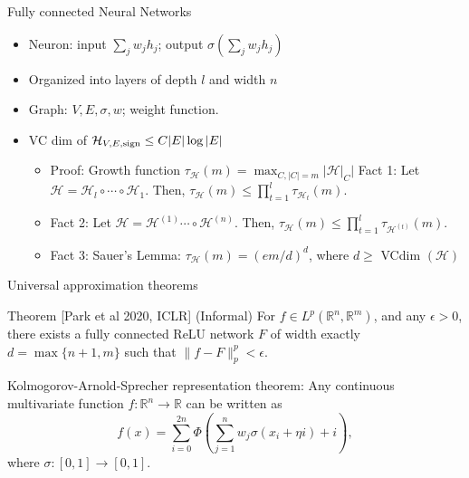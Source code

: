 \documentclass[final]{beamer}
\begin{document}
\begin{frame}{Fully connected Neural Networks}
	\begin{itemize}
		\item Neuron: input $\sum_j w_j h_j$; output $\sigma(\sum_j w_j h_j)$
		\item Organized into layers of depth $l$ and width $n$
		
		\item Graph: $V, E, \sigma, w$; weight function.
		\pause
	\item VC dim of $\mathcal{H}_{V, E, {\rm sign}} \leq C |E|\log |E|$
		\pause
		\begin{itemize}
		\item Proof: Growth function $\tau_{\mathcal{H}}(m) = \max_{C, |C|=m} |\mathcal{H}|_C| $
			\pause Fact 1: Let $\mathcal{H} =\mathcal{H}_l \circ \cdots \circ \mathcal{H}_1.$ Then,  $\tau_{\mathcal{H}}(m) \leq \prod_{t=1}^l \tau_{\mathcal{H}_t}(m)$.
			\pause 
			\item
			Fact 2: Let $\mathcal{H} =\mathcal{H}^{(1)}  \cdots \circ \mathcal{H}^{(n)}.$ Then,  $\tau_{\mathcal{H}}(m) \leq \prod_{t=1}^l \tau_{\mathcal{H}^{(t)}}(m)$.
			\pause 
		\item Fact 3: Sauer's Lemma: $\tau_{\mathcal{H}}(m) = (em/d)^d$, where $d \geq $ VCdim $(\mathcal{H})$ 
		\end{itemize}
	\end{itemize}

\end{frame}
\begin{frame}{Universal approximation theorems}
	\begin{tcolorbox}
		Theorem [Park et al 2020, ICLR] (Informal) For $f\in L^p(\mathbb{R}^n, \mathbb{R}^m)$, and any $\epsilon > 0$, there exists a fully connected ReLU network $F$ of width exactly $d = \max\{n+1,m\}$ such that $\|f - F\|_p^p < \epsilon.$
	\end{tcolorbox}
	\begin{tcolorbox}
		Kolmogorov-Arnold-Sprecher representation theorem: Any continuous multivariate function $f:\mathbb{R}^n\to\mathbb{R}$ can be written as $$f(x) = \sum_{i=0}^{2n} \Phi(\sum_{j=1}^n w_j\sigma(x_i+\eta i) + i),$$ where $\sigma:[0,1]\to[0,1].$
	\end{tcolorbox}
\end{frame}
\end{document}
